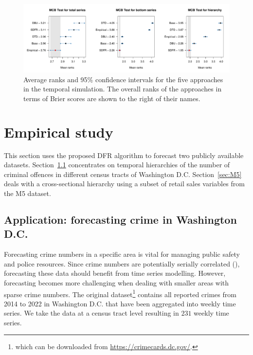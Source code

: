 \documentclass[a4paper,review,11pt,authoryear]{elsarticle}
\theoremstyle{definition}
\begin{document}
     \begin{figure}
       \caption{\label{fig:sim_temporal_mcb_prob}Average ranks and 95\% confidence intervals for the five approaches in the temporal simulation. The overall ranks of the approaches in terms of Brier scores are shown to the right of their names.}
       \includegraphics[width=\textwidth]{figures/temporal_mcb.pdf}
     \end{figure}

     \section{Empirical study}
     \label{sec:application}
     This section uses the proposed DFR algorithm to forecast two publicly available datasets.
     Section~\ref{sec:application_crime} concentrates on temporal hierarchies of the number of criminal offences in different census tracts of Washington D.C.
     Section~\ref{sec:M5} deals with a cross-sectional hierarchy using a subset of retail sales variables from the M5 dataset.

     \subsection{Application: forecasting crime in Washington D.C.}
     \label{sec:application_crime}

     Forecasting crime numbers in a specific area is vital for managing public safety and police resources. Since crime numbers are potentially serially correlated (\citealp{aldor-noimanSpatioTemporalLowCount2013}), forecasting these data should benefit from time series modelling.
     However, forecasting becomes more challenging when dealing with smaller areas with sparse crime numbers.
     The original dataset\footnote{which can be downloaded from \url{https://crimecards.dc.gov/}.} contains all reported crimes from 2014 to 2022 in Washington D.C. that have been aggregated into weekly time series. We take the data at a census tract level resulting in $231$ weekly time series. 
\end{document}
